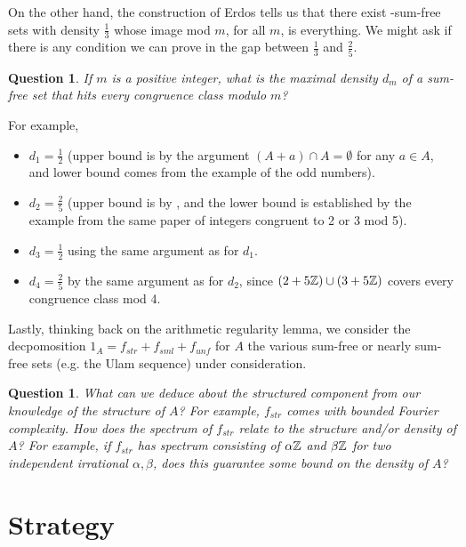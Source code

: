 \documentclass{report}
\newtheorem{question}[theorem]{Question}
\theoremstyle{remark}
\numberwithin{equation}{section}
\begin{document}
On the other hand, the construction of Erdos tells us that there exist
-sum-free sets with density $\frac13$ whose image mod $m$, for all $m$,
is everything.  We might ask if there is any condition we can prove in
the gap between $\frac13$ and $\frac25$.  

\begin{question}\label{qn:irregularity_density}
  If $m$ is a positive integer, what is the maximal density $d_m$ of a
  sum-free set that hits every congruence class modulo $m$?
\end{question}

For example, 

\begin{itemize}
\item $d_1 = \frac12$ (upper bound is by the argument $(A + a) \cap A =
  \emptyset$ for any $a\in A$, and lower bound comes from the example
  of the odd numbers).
\item $d_2 = \frac25$ (upper bound is by
  \cite{luczak:jct1995}, and the lower bound is established
  by the example from the same paper of integers congruent to 2 or 3
  mod 5).
\item $d_3 = \frac12$ using the same argument as for $d_1$.
\item $d_4 = \frac25$ by the same argument as for $d_2$, since
  $(2+5\mathbb{Z}) \cup (3+5\mathbb{Z})$ covers every congruence class mod 4.
\end{itemize}

Lastly, thinking back on the arithmetic regularity lemma, we consider
the decpomosition $1_A = f_{str} + f_{sml} + f_{unf}$ for $A$ the
various sum-free or nearly sum-free sets (e.g. the Ulam sequence)
under consideration.  

\begin{question}\label{qn:fourier_complexity_density}
  What can we deduce about the structured component from our knowledge
  of the structure of $A$?  For example, $f_{str}$ comes with bounded
  Fourier complexity.  How does the spectrum of $f_{str}$ relate to
  the structure and/or density of $A$?  For example, if $f_{str}$ has
  spectrum consisting of $\alpha\mathbb{Z}$ and $\beta\mathbb{Z}$ for two independent
  irrational $\alpha, \beta$, does this guarantee some bound on the
  density of $A$?  
\end{question}

\chapter{Strategy}
\end{document}
